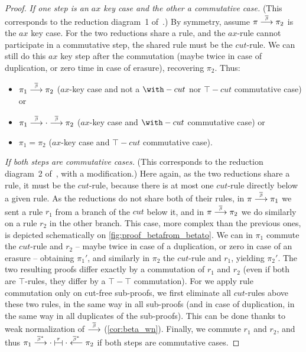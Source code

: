 \documentclass{lmcs}
\newcommand{\symboltext}[2]{\mathrel{\overset{\makebox[0pt]{\mbox{\normalfont\tiny\sffamily \ensuremath{#1}}}}{#2}}} %
\newcommand{\betabar}{\overline{\beta}}
\newcommand{\betabarto}{\symboltext{\betabar}{\longrightarrow}}
\newcommand{\betabartostar}{\symboltext{\betabar^*}{\longrightarrow}}
\newcommand{\betabarfromstar}{\symboltext{\betabar^*}{\longleftarrow}}
\newcommand{\vdashv}{\mathrel{\lower .22ex \hbox{$\vdash\!\dashv$}}}
\DeclareRobustCommand{\astsymbol}[1]{\mathrel{\ooalign{{$\vdashv$}\crcr{$\stackrel{#1}{\hphantom{\vdashv}\vphantom{\to}}$}}}}
\newcommand{\eqcone}{\astsymbol{r}} %
\newcommand*{\proofpar}[1]{\textit{#1}}
\begin{document}
\begin{proof}
\proofpar{If one step is an $ax$ key case and the other a commutative case.}
(This corresponds to the reduction diagram~1 of~\cite[Section~B.2.1]{calculusformall}.)
By symmetry, assume $\pi\betabarto\pi_2$ is the $ax$ key case.
For the two reductions share a rule, and the $ax$-rule cannot participate in a commutative step, the shared rule must be the $cut$-rule.
We can still do this $ax$ key step after the commutation (maybe twice in case of duplication, or zero time in case of erasure), recovering $\pi_2$.
Thus:
\begin{itemize}
\item $\pi_1\betabarto\pi_2$ ($ax$-key case and not a $\with-cut$ nor $\top-cut$ commutative case) or
\item $\pi_1\betabarto\cdot\betabarto\pi_2$ ($ax$-key case and $\with-cut$ commutative case) or
\item $\pi_1=\pi_2$ ($ax$-key case and $\top-cut$ commutative case).
\end{itemize}

\proofpar{If both steps are commutative cases.}
(This corresponds to the reduction diagram~2 of~\cite[Section~B.2.1]{calculusformall}, with a modification.)
Here again, as the two reductions share a rule, it must be the $cut$-rule, because there is at most one $cut$-rule directly below a given rule.
As the reductions do not share both of their rules, in $\pi\betabarto\pi_1$ we sent a rule $r_1$ from a branch of the $cut$ below it, and in $\pi\betabarto\pi_2$ we do similarly on a rule $r_2$ in the other branch.
This case, more complex than the previous ones, is depicted schematically on \autoref{fig:proof_betafrom_betato}.
We can in $\pi_1$ commute the $cut$-rule and $r_2$ -- maybe twice in case of a duplication, or zero in case of an erasure -- obtaining $\pi_1'$, and similarly in $\pi_2$ the $cut$-rule and $r_1$, yielding $\pi_2'$.
The two resulting proofs differ exactly by a commutation of $r_1$ and $r_2$ (even if both are $\top$-rules, they differ by a $\top-\top$ commutation).
For we apply rule commutation only on cut-free sub-proofs, we first eliminate all $cut$-rules above these two rules, in the same way in all sub-proofs (and in case of duplication, in the same way in all duplicates of the sub-proofs).
This can be done thanks to weak normalization of $\betabarto$ (\autoref{cor:beta_wn}).
Finally, we commute $r_1$ and $r_2$, and thus $\pi_1\betabartostar\cdot\eqcone\cdot\betabarfromstar\pi_2$ if both steps are commutative cases.


\end{proof}
\end{document}
